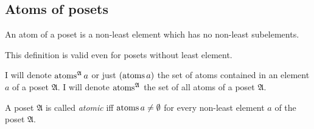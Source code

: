 \subsection{Atoms of posets}
\begin{defn}
An atom of a poset is a non-least element which has no non-least
subelements.\end{defn}
\begin{rem}
This definition is valid even for posets without least element.
\end{rem}
I will denote $\operatorname{atoms}^{\mathfrak{A}}a$ or just $(\operatorname{atoms} a)$ the
set of atoms contained in an element $a$ of a poset $\mathfrak{A}$.
I will denote $\operatorname{atoms}^{\mathfrak{A}}$ the set of all atoms of a poset
$\mathfrak{A}$.
\begin{defn}
A poset $\mathfrak{A}$ is called \emph{atomic} iff
$\operatorname{atoms} a\neq\emptyset$ for every non-least element $a$ of the poset
$\mathfrak{A}$.
\end{defn}

